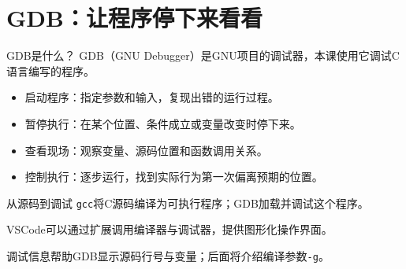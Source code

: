 \section{GDB：让程序停下来看看}

\begin{frame}{GDB是什么？}
    \alert{GDB（GNU Debugger）}是GNU项目的调试器，本课使用它调试C语言编写的程序。
    \medskip
    \begin{itemize}
        \item \alert{启动程序}：指定参数和输入，复现出错的运行过程。
        \item \alert{暂停执行}：在某个位置、条件成立或变量改变时停下来。
        \item \alert{查看现场}：观察变量、源码位置和函数调用关系。
        \item \alert{控制执行}：逐步运行，找到实际行为第一次偏离预期的位置。
    \end{itemize}
    \medskip
    \begin{vspquotered}{从源码到调试}
        \texttt{gcc}将C源码编译为可执行程序；GDB加载并调试这个程序。\par
        VSCode可以通过扩展调用编译器与调试器，提供图形化操作界面。
    \end{vspquotered}
    \small 调试信息帮助GDB显示源码行号与变量；后面将介绍编译参数\texttt{-g}。
\end{frame}

